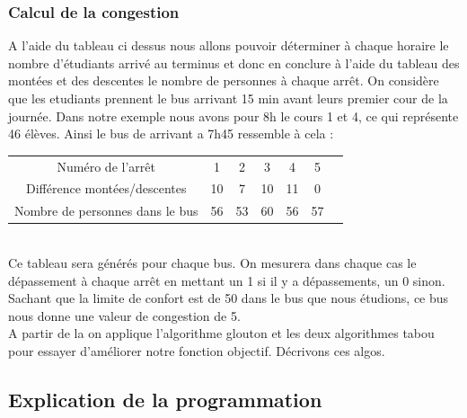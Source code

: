 \documentclass[a4paper,11pt]{article}
\begin{document}
		\subsubsection{Calcul de la congestion}
			A l'aide du tableau ci dessus nous allons pouvoir déterminer à chaque horaire le nombre d'étudiants arrivé au terminus et donc en conclure à l'aide du tableau des montées et des descentes le nombre de personnes à chaque arrêt. 
			On considère que les etudiants prennent le bus arrivant 15 min avant leurs premier cour de la journée.
			Dans notre exemple nous avons pour  8h le cours 1 et 4, ce qui représente 46 élèves. Ainsi le bus de arrivant a 7h45 ressemble à cela :  \\
			\begin{tabular}{ | c | c | c | c | c | c | c |}
 				\hline			
   				Numéro de l'arrêt & 1 & 2 & 3 & 4 & 5\\
   				Différence montées/descentes & 10 & 7 & 10 & 11 & 0\\
   				Nombre de personnes dans le bus & 56 & 53 & 60 & 56 & 57\\
 				\hline  
 			\end{tabular}\\
 			Ce tableau sera générés pour chaque bus. On mesurera dans chaque cas le dépassement à chaque arrêt en mettant un 1 si il y a dépassements, un 0 sinon.
 			Sachant que la limite de confort est de 50 dans le bus que nous étudions, ce bus nous donne une valeur de congestion de 5.\\
 			A partir de la on applique l'algorithme glouton et les deux algorithmes tabou pour essayer d'améliorer notre fonction objectif.
 			Décrivons ces algos.

	\subsection{Explication de la programmation}
\end{document}
